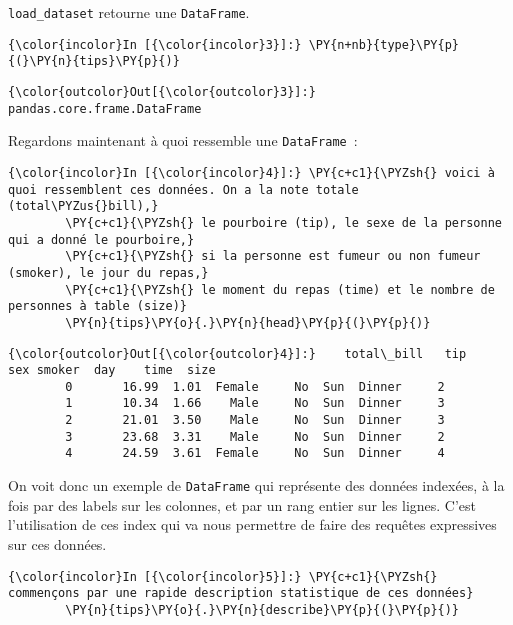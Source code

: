     \texttt{load\_dataset} retourne une \texttt{DataFrame}.

    \begin{Verbatim}[commandchars=\\\{\}]
{\color{incolor}In [{\color{incolor}3}]:} \PY{n+nb}{type}\PY{p}{(}\PY{n}{tips}\PY{p}{)}
\end{Verbatim}


\begin{Verbatim}[commandchars=\\\{\}]
{\color{outcolor}Out[{\color{outcolor}3}]:} pandas.core.frame.DataFrame
\end{Verbatim}
            
    Regardons maintenant à quoi ressemble une \texttt{DataFrame}~:

    \begin{Verbatim}[commandchars=\\\{\}]
{\color{incolor}In [{\color{incolor}4}]:} \PY{c+c1}{\PYZsh{} voici à quoi ressemblent ces données. On a la note totale (total\PYZus{}bill),}
        \PY{c+c1}{\PYZsh{} le pourboire (tip), le sexe de la personne qui a donné le pourboire,}
        \PY{c+c1}{\PYZsh{} si la personne est fumeur ou non fumeur (smoker), le jour du repas,}
        \PY{c+c1}{\PYZsh{} le moment du repas (time) et le nombre de personnes à table (size)}
        \PY{n}{tips}\PY{o}{.}\PY{n}{head}\PY{p}{(}\PY{p}{)}
\end{Verbatim}


\begin{Verbatim}[commandchars=\\\{\}]
{\color{outcolor}Out[{\color{outcolor}4}]:}    total\_bill   tip     sex smoker  day    time  size
        0       16.99  1.01  Female     No  Sun  Dinner     2
        1       10.34  1.66    Male     No  Sun  Dinner     3
        2       21.01  3.50    Male     No  Sun  Dinner     3
        3       23.68  3.31    Male     No  Sun  Dinner     2
        4       24.59  3.61  Female     No  Sun  Dinner     4
\end{Verbatim}
            
    On voit donc un exemple de \texttt{DataFrame} qui représente des données
indexées, à la fois par des labels sur les colonnes, et par un rang
entier sur les lignes. C'est l'utilisation de ces index qui va nous
permettre de faire des requêtes expressives sur ces données.

    \begin{Verbatim}[commandchars=\\\{\}]
{\color{incolor}In [{\color{incolor}5}]:} \PY{c+c1}{\PYZsh{} commençons par une rapide description statistique de ces données}
        \PY{n}{tips}\PY{o}{.}\PY{n}{describe}\PY{p}{(}\PY{p}{)}
\end{Verbatim}


